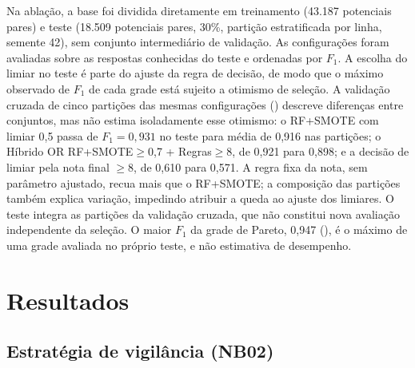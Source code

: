 Na ablação, a base foi dividida diretamente em treinamento (43.187 potenciais pares) e teste (18.509 potenciais pares, 30\%, partição estratificada por linha, semente 42), sem conjunto intermediário de validação. As configurações foram avaliadas sobre as respostas conhecidas do teste e ordenadas por $F_1$. A escolha do limiar no teste é parte do ajuste da regra de decisão, de modo que o máximo observado de $F_1$ de cada grade está sujeito a otimismo de seleção. A validação cruzada de cinco partições das mesmas configurações () descreve diferenças entre conjuntos, mas não estima isoladamente esse otimismo: o RF+SMOTE com limiar 0,5 passa de $F_1=0{,}931$ no teste para média de 0,916 nas partições; o Híbrido OR RF+SMOTE$\geq$0,7 + Regras$\geq$8, de 0,921 para 0,898; e a decisão de limiar pela nota final $\geq 8$, de 0,610 para 0,571. A regra fixa da nota, sem parâmetro ajustado, recua mais que o RF+SMOTE; a composição das partições também explica variação, impedindo atribuir a queda ao ajuste dos limiares. O teste integra as partições da validação cruzada, que não constitui nova avaliação independente da seleção. O maior $F_1$ da grade de Pareto, 0,947 (), é o máximo de uma grade avaliada no próprio teste, e não estimativa de desempenho.

\section{Resultados}\label{sec:e3-ap-resultados}

\subsection{Estratégia de vigilância (NB02)}\label{sec:e3-nb02}

